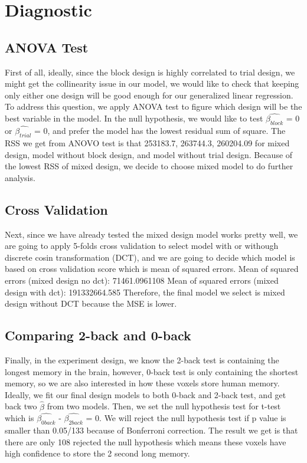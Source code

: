 \section{Diagnostic}
\subsection{ANOVA Test}
First of all, ideally, since the block design is highly correlated to trial 
design, we might get the collinearity issue in our model, we would like to check
that keeping only either one design will be good enough for our generalized 
linear regression. To address this question, we apply ANOVA test to figure which
design will be the best variable in the model. In the null hypothesis, we would
like to test $\hat{\beta_{block}}$ = 0 or $\hat{\beta_{trial}}$ = 0, and prefer
the model has the lowest residual sum of square.
The RSS we get from ANOVO test is that 253183.7, 263744.3, 260204.09 for mixed
design, model without block design, and model without trial design. Because of 
the lowest RSS of mixed design, we decide to choose mixed model to do further 
analysis.

\subsection{Cross Validation}
Next, since we have already tested the mixed design model works pretty well, we are 
going to apply 5-folds cross validation to select model with or withough 
discrete cosin transformation (DCT), and we are going to decide which model is 
based on cross validation score which is mean of squared errors.
Mean of squared errors (mixed design no dct):  71461.0961108
Mean of squared errors (mixed design with dct):  191332664.585
Therefore, the final model we select is mixed design without DCT because the MSE
is lower.

\subsection{Comparing 2-back and 0-back}
Finally, in the experiment design, we know the 2-back test is containing the 
longest memory in the brain, however, 0-back test is only containing the shortest
memory, so we are also interested in how these voxels store human memory.
Ideally, we fit our final design models to both 0-back and 2-back test, and 
get back two $\hat{\beta}$ from two models. Then, we set the null hypothesis test
for t-test which is $\hat{\beta_{0back}}$ - $\hat{\beta_{2back}}$ = 0. We will
reject the null hypothesis test if p value is smaller than 0.05/133 because of 
Bonferroni correction. The result we get is that there are only 108 rejected 
the null hypothesis which means these voxels have high confidence to store the 
2 second long memory.	
